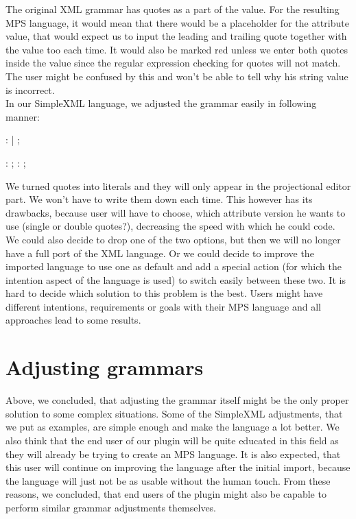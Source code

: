 The original XML grammar has quotes as a part of the value.
For the resulting MPS language, it would mean that there would be a placeholder for the attribute value, that would expect us to input the leading and trailing quote together with the value too each time.
It would also be marked red unless we enter both quotes inside the value since the regular expression checking for quotes will not match.
The user might be confused by this and won't be able to tell why his string value is incorrect.
\\

In our SimpleXML language, we adjusted the grammar easily in following manner:

\begin{antlr}
	   :      
	            |      
	            ;

	       :   \regex{~["]*} ;
	       :   \regex{~[']*} ;
\end{antlr}

We turned quotes into literals and they will only appear in the projectional editor part.
We won't have to write them down each time.
This however has its drawbacks, because user will have to choose, which attribute version he wants to use (single or double quotes?), decreasing the speed with which he could code.
We could also decide to drop one of the two options, but then we will no longer have a full port of the XML language.
Or we could decide to improve the imported language to use one as default and add a special action (for which the intention aspect of the language is used) to switch easily between these two.
It is hard to decide which solution to this problem is the best.
Users might have different intentions, requirements or goals with their MPS language and all approaches lead to some results.

\section{Adjusting grammars}
Above, we concluded, that adjusting the grammar itself might be the only proper solution to some complex situations.
Some of the SimpleXML adjustments, that we put as examples, are simple enough and make the language a lot better.
We also think that the end user of our plugin will be quite educated in this field as they will already be trying to create an MPS language.
It is also expected, that this user will continue on improving the language after the initial import, because the language will just not be as usable without the human touch.
From these reasons, we concluded, that end users of the plugin might also be capable to perform similar grammar adjustments themselves.

